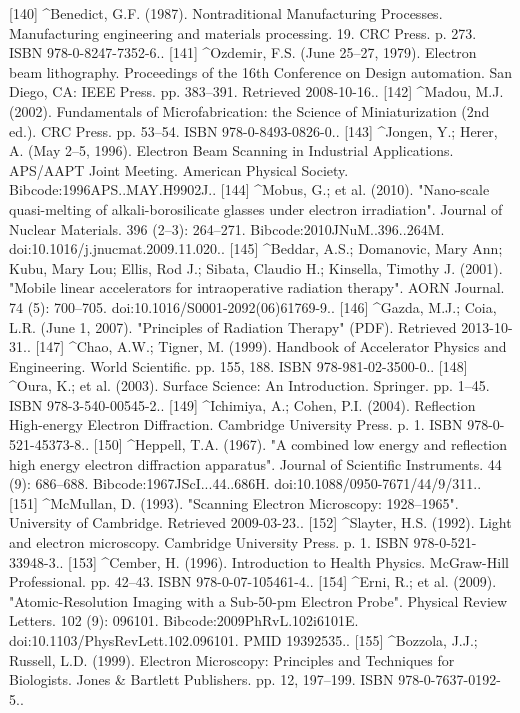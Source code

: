 [140]
^Benedict, G.F. (1987). Nontraditional Manufacturing Processes. Manufacturing engineering and materials processing. 19. CRC Press. p. 273. ISBN 978-0-8247-7352-6..
[141]
^Ozdemir, F.S. (June 25–27, 1979). Electron beam lithography. Proceedings of the 16th Conference on Design automation. San Diego, CA: IEEE Press. pp. 383–391. Retrieved 2008-10-16..
[142]
^Madou, M.J. (2002). Fundamentals of Microfabrication: the Science of Miniaturization (2nd ed.). CRC Press. pp. 53–54. ISBN 978-0-8493-0826-0..
[143]
^Jongen, Y.; Herer, A. (May 2–5, 1996). Electron Beam Scanning in Industrial Applications. APS/AAPT Joint Meeting. American Physical Society. Bibcode:1996APS..MAY.H9902J..
[144]
^Mobus, G.; et al. (2010). "Nano-scale quasi-melting of alkali-borosilicate glasses under electron irradiation". Journal of Nuclear Materials. 396 (2–3): 264–271. Bibcode:2010JNuM..396..264M. doi:10.1016/j.jnucmat.2009.11.020..
[145]
^Beddar, A.S.; Domanovic, Mary Ann; Kubu, Mary Lou; Ellis, Rod J.; Sibata, Claudio H.; Kinsella, Timothy J. (2001). "Mobile linear accelerators for intraoperative radiation therapy". AORN Journal. 74 (5): 700–705. doi:10.1016/S0001-2092(06)61769-9..
[146]
^Gazda, M.J.; Coia, L.R. (June 1, 2007). "Principles of Radiation Therapy" (PDF). Retrieved 2013-10-31..
[147]
^Chao, A.W.; Tigner, M. (1999). Handbook of Accelerator Physics and Engineering. World Scientific. pp. 155, 188. ISBN 978-981-02-3500-0..
[148]
^Oura, K.; et al. (2003). Surface Science: An Introduction. Springer. pp. 1–45. ISBN 978-3-540-00545-2..
[149]
^Ichimiya, A.; Cohen, P.I. (2004). Reflection High-energy Electron Diffraction. Cambridge University Press. p. 1. ISBN 978-0-521-45373-8..
[150]
^Heppell, T.A. (1967). "A combined low energy and reflection high energy electron diffraction apparatus". Journal of Scientific Instruments. 44 (9): 686–688. Bibcode:1967JScI...44..686H. doi:10.1088/0950-7671/44/9/311..
[151]
^McMullan, D. (1993). "Scanning Electron Microscopy: 1928–1965". University of Cambridge. Retrieved 2009-03-23..
[152]
^Slayter, H.S. (1992). Light and electron microscopy. Cambridge University Press. p. 1. ISBN 978-0-521-33948-3..
[153]
^Cember, H. (1996). Introduction to Health Physics. McGraw-Hill Professional. pp. 42–43. ISBN 978-0-07-105461-4..
[154]
^Erni, R.; et al. (2009). "Atomic-Resolution Imaging with a Sub-50-pm Electron Probe". Physical Review Letters. 102 (9): 096101. Bibcode:2009PhRvL.102i6101E. doi:10.1103/PhysRevLett.102.096101. PMID 19392535..
[155]
^Bozzola, J.J.; Russell, L.D. (1999). Electron Microscopy: Principles and Techniques for Biologists. Jones & Bartlett Publishers. pp. 12, 197–199. ISBN 978-0-7637-0192-5..
